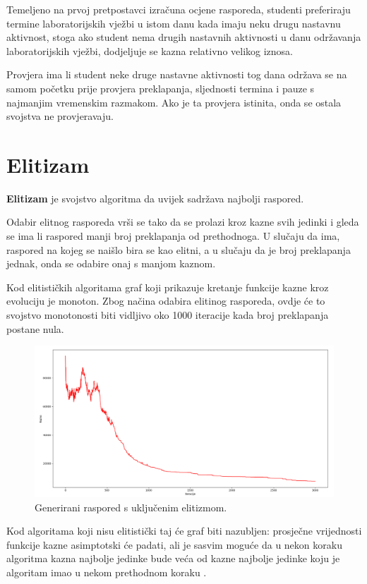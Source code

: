 \documentclass[times, utf8, zavrsni]{fer}
\begin{document}
Temeljeno na prvoj pretpostavci izračuna ocjene rasporeda, studenti preferiraju termine laboratorijskih vježbi u istom danu kada imaju neku drugu nastavnu aktivnost, stoga ako student nema drugih nastavnih aktivnosti u danu održavanja laboratorijskih vježbi, dodjeljuje se kazna relativno velikog iznosa.

Provjera ima li student neke druge nastavne aktivnosti tog dana održava se na samom početku prije provjera preklapanja, sljednosti termina i pauze s najmanjim vremenskim razmakom. Ako je ta provjera istinita, onda se ostala svojstva ne provjeravaju.

\section{Elitizam}

\textbf{Elitizam}  je svojstvo algoritma da uvijek sadržava najbolji raspored.

Odabir elitnog rasporeda vrši se tako da se prolazi kroz kazne svih jedinki i gleda se ima li raspored manji broj preklapanja od prethodnoga. U slučaju da ima, raspored na kojeg se naišlo bira se kao elitni, a u slučaju da je broj preklapanja jednak, onda se odabire onaj s manjom kaznom.

Kod elitističkih algoritama graf koji prikazuje kretanje funkcije kazne kroz evoluciju je monoton. Zbog načina odabira elitinog rasporeda, ovdje će to svojstvo monotonosti biti vidljivo oko 1000 iteracije kada broj preklapanja postane nula.

\begin{figure}[htb]
\centering
\includegraphics[width=14cm]{images/elitizam_da.png}
\caption{Generirani raspored s uključenim elitizmom.}
\label{fig:elitiziam_da}
\end{figure}

Kod algoritama koji nisu elitistički taj će graf biti nazubljen: prosječne vrijednosti funkcije kazne asimptotski će padati, ali je sasvim moguće da u nekon koraku algoritma kazna najbolje jedinke bude veća od kazne najbolje jedinke koju je algoritam imao u nekom prethodnom koraku \citep{cupic-skripta}.
\end{document}
